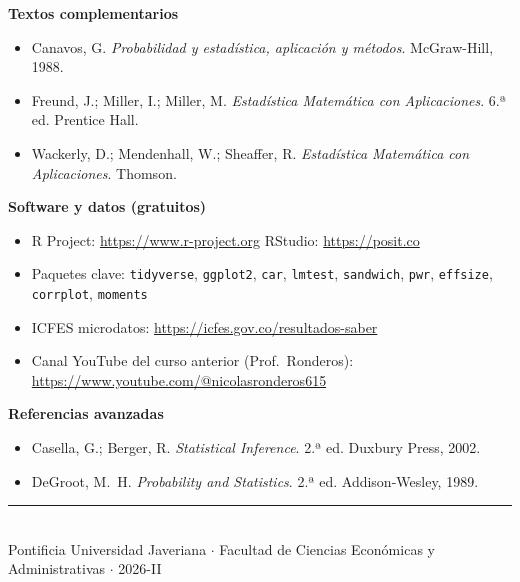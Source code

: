 \documentclass[11pt, a4paper]{article}
\begin{document}
\textbf{Textos complementarios}
\begin{itemize}
  \item Canavos, G. \textit{Probabilidad y estad\'istica, aplicaci\'on y m\'etodos}. McGraw-Hill, 1988.
  \item Freund, J.; Miller, I.; Miller, M. \textit{Estad\'istica Matem\'atica con Aplicaciones}.
        6.ª ed. Prentice Hall.
  \item Wackerly, D.; Mendenhall, W.; Sheaffer, R. \textit{Estad\'istica Matem\'atica con
        Aplicaciones}. Thomson.
\end{itemize}

\begin{sloppypar}
\textbf{Software y datos (gratuitos)}
\begin{itemize}
  \item R Project: \url{https://www.r-project.org} \quad RStudio: \url{https://posit.co}
  \item Paquetes clave: \texttt{tidyverse}, \texttt{ggplot2}, \texttt{car},
        \texttt{lmtest}, \texttt{sandwich}, \texttt{pwr}, \texttt{effsize},
        \texttt{corrplot}, \texttt{moments}
  \item ICFES microdatos: \url{https://icfes.gov.co/resultados-saber}
  \item Canal YouTube del curso anterior (Prof.\ Ronderos):
        \url{https://www.youtube.com/@nicolasronderos615}
\end{itemize}
\end{sloppypar}

\textbf{Referencias avanzadas}
\begin{itemize}
  \item Casella, G.; Berger, R. \textit{Statistical Inference}. 2.ª ed. Duxbury Press, 2002.
  \item DeGroot, M.\ H. \textit{Probability and Statistics}. 2.ª ed. Addison-Wesley, 1989.
\end{itemize}

\vspace{16pt}
\begin{center}
\rule{0.5\linewidth}{0.4pt}\\[4pt]
{\small Pontificia Universidad Javeriana $\cdot$
  Facultad de Ciencias Econ\'omicas y Administrativas $\cdot$ 2026-II}
\end{center}
\end{document}
